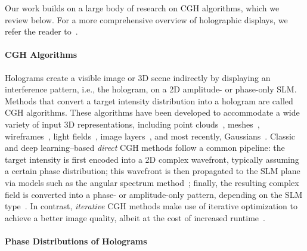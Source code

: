 Our work builds on a large body of research on CGH algorithms, which we review below. For a more comprehensive overview of holographic displays, we refer the reader to~\cite{yaracs2010state,park2017recent,chang2020toward,javidi2021roadmap, pi2022review}.

\paragraph{\bf{CGH Algorithms}}
Holograms create a visible image or 3D scene indirectly by displaying an interference pattern, i.e., the hologram, on a 2D amplitude- or phase-only SLM. Methods that convert a target intensity distribution into a hologram are called CGH algorithms. These algorithms have been developed to accommodate a wide variety of input 3D representations, including point clouds~\cite{h2009computer, lucente1993interactive}, meshes~\cite{matsushima2003fast, ahrenberg2008computer}, wireframes~\cite{blinder2021real}, light fields~\cite{padmanaban2019holographic, zhang2019three, park2019non, kang2008accurate, choi2022time}, image layers~\cite{chen2015improved, shi2022end}, and most recently, Gaussians~\cite{choi2025gaussian}. Classic and deep learning–based \textit{direct} CGH methods follow a common pipeline: the target intensity is first encoded into a 2D complex wavefront, typically assuming a certain phase distribution; this wavefront is then propagated to the SLM plane via models such as the angular spectrum method~\cite{goodman2005introduction, pellat1994fresnel}; finally, the resulting complex field is converted into a phase- or amplitude-only pattern, depending on the SLM type~\cite{tsang2013novel, maimone2017holographic, qi2016speckleless}. In contrast, \emph{iterative} CGH methods make use of iterative optimization to achieve a better image quality, albeit at the cost of increased runtime~\cite{gerchberg1972practical, fienup1980iterative, zhang20173d, peng2020neural, chakravarthula2019wirtinger}.

\paragraph{\bf{Phase Distributions of Holograms}}

